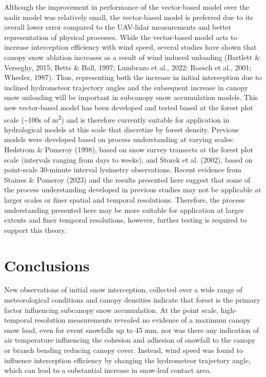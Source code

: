 \documentclass[
  letterpaper,
  DIV=11,
  numbers=noendperiod]{scrartcl}
\begin{document}
Although the improvement in performance of the vector-based model over
the nadir model was relatively small, the vector-based model is
preferred due to its overall lower error compared to the UAV-lidar
measurements and better representation of physical processes. While the
vector-based model acts to increase interception efficiency with wind
speed, several studies have shown that canopy snow ablation increases as
a result of wind induced unloading (Bartlett \& Verseghy, 2015; Betts \&
Ball, 1997; Lumbrazo et al., 2022; Roesch et al., 2001; Wheeler, 1987).
Thus, representing both the increase in initial interception due to
inclined hydrometeor trajectory angles and the subsequent increase in
canopy snow unloading will be important in subcanopy snow accumulation
models. This new vector-based model has been developed and tested based
at the forest plot scale (\textasciitilde100s of m\textsuperscript{2})
and is therefore currently suitable for application in hydrological
models at this scale that discretize by forest density. Previous models
were developed based on process understanding at varying scales:
Hedstrom \& Pomeroy (1998), based on snow survey transects at the forest
plot scale (intervals ranging from days to weeks), and Storck et al.
(2002), based on point-scale 30-minute interval lysimetry observations.
Recent evidence from Staines \& Pomeroy (2023) and the results presented
here suggest that some of the process understanding developed in
previous studies may not be applicable at larger scales or finer spatial
and temporal resolutions. Therefore, the process understanding presented
here may be more suitable for application at larger extents and finer
temporal resolutions, however, further testing is required to support
this theory.

\section{Conclusions}\label{conclusions}

New observations of initial snow interception, collected over a wide
range of meteorological conditions and canopy densities indicate that
forest is the primary factor influencing subcanopy snow accumulation. At
the point scale, high-temporal resolution measurements revealed no
evidence of a maximum canopy snow load, even for event snowfalls up to
45 mm, nor was there any indication of air temperature influencing the
cohesion and adhesion of snowfall to the canopy or branch bending
reducing canopy cover. Instead, wind speed was found to influence
interception efficiency by changing the hydrometeor trajectory angle,
which can lead to a substantial increase in snow-leaf contact area.
\end{document}
